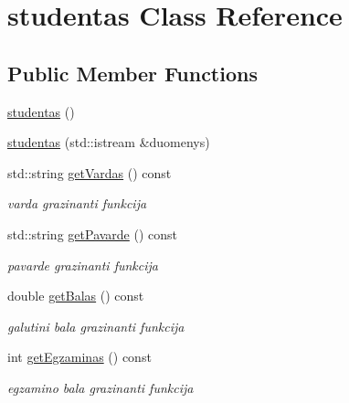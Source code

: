 \hypertarget{classstudentas}{}\section{studentas Class Reference}
\label{classstudentas}
\subsection*{Public Member Functions}
\begin{DoxyCompactItemize}
\item 
\mbox{\hyperlink{classstudentas_a40a99ea5d527a3d443123f4785550787}{studentas}} ()
\item 
\mbox{\hyperlink{classstudentas_acb3167a335b73211915751ba1652e302}{studentas}} (std\+::istream \&duomenys)
\item 
\mbox{\label{classstudentas_a7ebf70d9adaf2009f25967e37468cb25}} 
std\+::string \mbox{\hyperlink{classstudentas_a7ebf70d9adaf2009f25967e37468cb25}{get\+Vardas}} () const
\begin{DoxyCompactList}\small\item\em varda grazinanti funkcija \end{DoxyCompactList}\item 
\mbox{\label{classstudentas_a0d290bc24c47b735bd5eac96f9c9e93e}} 
std\+::string \mbox{\hyperlink{classstudentas_a0d290bc24c47b735bd5eac96f9c9e93e}{get\+Pavarde}} () const
\begin{DoxyCompactList}\small\item\em pavarde grazinanti funkcija \end{DoxyCompactList}\item 
\mbox{\label{classstudentas_a2ed748d9ee5c6b5bfd70bb2d50505289}} 
double \mbox{\hyperlink{classstudentas_a2ed748d9ee5c6b5bfd70bb2d50505289}{get\+Balas}} () const
\begin{DoxyCompactList}\small\item\em galutini bala grazinanti funkcija \end{DoxyCompactList}\item 
\mbox{\label{classstudentas_a005a4c3ab079b040898b0ad12ddf23fe}} 
int \mbox{\hyperlink{classstudentas_a005a4c3ab079b040898b0ad12ddf23fe}{get\+Egzaminas}} () const
\begin{DoxyCompactList}\small\item\em egzamino bala grazinanti funkcija \end{DoxyCompactList}\item 

\end{DoxyCompactItemize}
